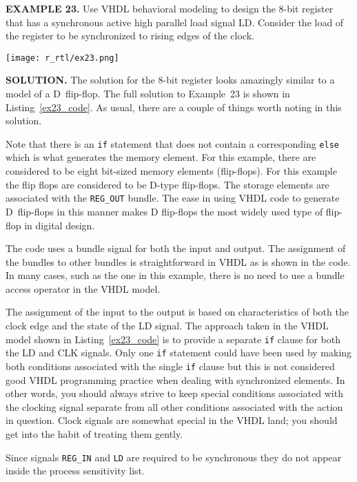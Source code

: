 \begin{leftbar}
\begin{minipage}[t]{0.52\textwidth}
\vspace{10pt}
\noindent
\textbf{EXAMPLE 23.}
Use VHDL behavioral modeling to design the 8-bit register that has a synchronous active high parallel load signal LD. Consider the load of the register to be synchronized to rising edges of the clock.
\end{minipage}
\begin{minipage}[t]{0.47\textwidth}
\vspace{0pt}\raggedright
    \centering
	\texttt{[image: r\_rtl/ex23.png]}
\end{minipage}
\end{leftbar}
\noindent
\textbf{SOLUTION.} The solution for the 8-bit register looks amazingly similar to a model of a D~flip-flop. The full solution to Example~23 is shown in Listing~\ref{ex23_code}. As usual, there are a couple of things worth noting in this solution.
\begin{my_list}
\item Note that there is an \texttt{if} statement that does not contain a corresponding \texttt{else} which is what generates the memory element. For this example, there are considered to be eight bit-sized memory elements (flip-flops). For this example the flip flops are considered to be D-type flip-flops. The storage elements are associated with the \texttt{REG\_OUT} bundle. The ease in using VHDL code to generate D~flip-flops in this manner makes D flip-flops the most widely used type of flip-flop in digital design.

\item The code uses a bundle signal for both the input and output. The assignment of the bundles to other bundles is straightforward in VHDL as is shown in the code. In many cases, such as the one in this example, there is no need to use a bundle access operator in the VHDL model.

\item The assignment of the input to the output is based on characteristics of both the clock edge and the state of the LD signal. The approach taken in the VHDL model shown in Listing~\ref{ex23_code} is to provide a separate \texttt{if} clause for both the LD and CLK signals. Only one \texttt{if} statement could have been used by making both conditions associated with the single \texttt{if} clause but this is not considered good VHDL programming practice when dealing with synchronized elements. In other words, you should always strive to keep special conditions associated with the clocking signal separate from all other conditions associated with the action in question. Clock signals are somewhat special in the VHDL land; you should get into the habit of treating them gently.

\item Since signals \texttt{REG\_IN} and \texttt{LD} are required to be synchronous they do not appear inside the process sensitivity list.
\end{my_list}

